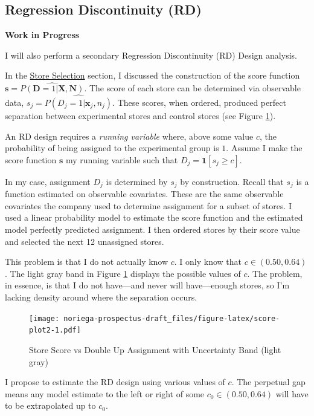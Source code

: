 \documentclass[12pt,letterpaperpaper,]{book}
\begin{document}
\subsection*{Regression Discontinuity
(RD)}\label{regression-discontinuity-rd}

\textbf{Work in Progress}

I will also perform a secondary Regression Discontinuity (RD) Design
analysis.

In the \protect\hyperlink{store-selection-1}{Store Selection} section, I
discussed the construction of the score function
\(\bm{s} = \widehat{P(\mathbf{D} = 1 | \bm{X}, \bm{N})}\). The score of
each store can be determined via observable data,
\(s_{j} = \widehat{P(D_{j} = 1|\bm{x}_{j}, n_{j})}\). These scores, when
ordered, produced perfect separation between experimental stores and
control stores (see Figure \ref{fig:score-plot2}).

An RD design requires a \emph{running variable} where, above some value
\(c\), the probability of being assigned to the experimental group is
\(1\). Assume I make the score function \(\bm{s}\) my running variable
such that \(D_{j} = \bm{1}[s_{j} \ge c]\).

In my case, assignment \(D_{j}\) is determined by \(s_{j}\) by
construction. Recall that \(s_{j}\) is a function estimated on
observable covariates. These are the same observable covariates the
company used to determine assignment for a subset of stores. I used a
linear probability model to estimate the score function and the
estimated model perfectly predicted assignment. I then ordered stores by
their score value and selected the next 12 unassigned stores.

This problem is that I do not actually know \(c\). I only know that
\(c \in (0.50, 0.64)\). The light gray band in Figure
\ref{fig:score-plot2} displays the possible values of \(c\). The
problem, in essence, is that I do not have---and never will
have---enough stores, so I'm lacking density around where the separation
occurs.

\begin{figure}
\centering
\texttt{[image: noriega-prospectus-draft\_files/figure-latex/score-plot2-1.pdf]}
\caption{\label{fig:score-plot2}Store Score vs Double Up Assignment with
Uncertainty Band (light gray)}
\end{figure}

I propose to estimate the RD design using various values of \(c\). The
perpetual gap means any model estimate to the left or right of some
\(c_0 \in (0.50, 0.64)\) will have to be extrapolated up to \(c_0\).
\end{document}
